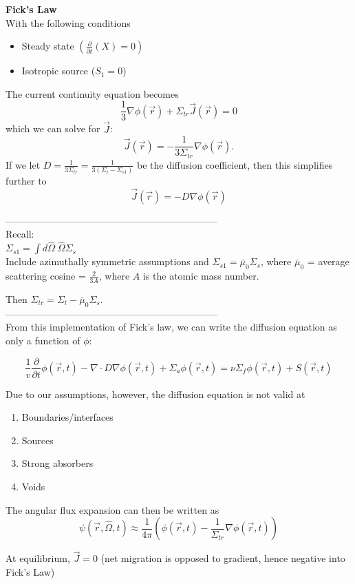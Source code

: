 \documentclass{report}
\newcommand{\p}{\partial}
\newcommand{\ppt}{\frac{\p}{\p t}}
\newcommand{\Xs}{\Sigma}
\newcommand{\Oov}{\frac{1}{v}}
\newcommand{\pos}{\vec{r}}
\newcommand{\cur}{\vec{J}}
\newcommand{\Oh}{\hat{\Omega}}
\newcommand{\rt}{(\pos,t)}
\newcommand{\rOt}{(\pos,\Oh,t)}
\begin{document}
\textbf{Fick's Law}\\

With the following conditions
\begin{itemize}
    \item Steady state $(\ppt(X) = 0)$
    \item Isotropic source ($S_1 = 0$)
\end{itemize}

The current continuity equation becomes
$$\frac{1}{3} \nabla \phi(\pos) + \Xs_{tr} \cur(\pos) = 0$$
which we can solve for $\cur$: 
$$\cur(\pos) = -\frac{1}{3\Xs_{ tr}} \nabla \phi(\pos).$$
If we let $D = \frac{1}{3\Xs_{tr}} = \frac{1}{3(\Xs_t-\Xs_{s1})}$ be the diffusion coefficient, then this simplifies further to
$$\cur(\pos) = -D \nabla \phi(\pos)$$

------------------------------------------------------------------\\
Recall:\\
$\Xs_{s1} = \int d\Oh \; \Oh \Xs_{s}$\\
Include azimuthally symmetric assumptions and $\Xs_{s1} = \bar{\mu}_0 \Xs_s$, where $\bar{\mu}_0$ = average scattering cosine = $\frac{2}{3A}$, where $A$ is the atomic mass number.

Then $\Xs_{tr} = \Xs_t - \bar{\mu}_0 \Xs_s$.\\
------------------------------------------------------------------\\

From this implementation of Fick's law, we can write the diffusion equation as only a function of $\phi$:

$$\Oov \ppt \phi\rt - \nabla \cdot D \nabla \phi\rt + \Xs_a \phi\rt = \nu\Xs_f \phi\rt + S\rt$$

Due to our assumptions, however, the diffusion equation is not valid at 
\begin{enumerate}
    \item Boundaries/interfaces
    \item Sources
    \item Strong absorbers
    \item Voids
\end{enumerate}

The angular flux expansion can then be written as 
$$\psi\rOt \approx \frac{1}{4\pi}\left( \phi\rt - \frac{1}{\Xs_{tr}} \nabla \phi\rt \right)$$

At equilibrium, $\cur = 0$ (net migration is opposed to gradient, hence negative into Fick's Law)
\end{document}

